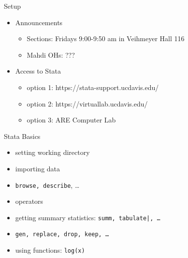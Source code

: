 \documentclass{beamer}
\begin{document}
\begin{frame}{Setup}
\begin{itemize}
\item Announcements
\begin{itemize}
\item Sections: Fridays 9:00-9:50 am in Veihmeyer Hall 116
\item Mahdi OHs: ???  
\end{itemize}
\item Access to Stata
\begin{itemize}
\item option 1: https://stata-support.ucdavis.edu/
\item option 2: https://virtuallab.ucdavis.edu/
\item option 3: ARE Computer Lab
\end{itemize}

\end{itemize}
\end{frame}

\begin{frame}{Stata Basics}

\begin{itemize}
\item setting working directory
\item importing data
\item \texttt{browse, describe}, \dots
\item operators
\item getting summary statistics: \texttt{summ, tabulate|, \dots}
\item \texttt{gen, replace, drop, keep, \dots}
\item using functions: \texttt{log(x)}

\end{itemize}

\end{frame}
\end{document}
